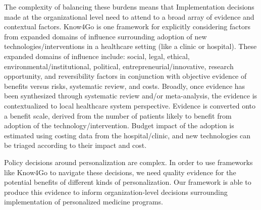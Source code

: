 The complexity of balancing these burdens means that Implementation decisions made at the organizational level need to attend to a broad array of evidence and contextual factors. Know4Go \cite{martin2016hospital} is one framework for explicitly considering factors from expanded domains of influence surrounding adoption of new technologies/interventions in a healthcare setting (like a clinic or hospital). These expanded domains of influence include: social, legal, ethical, environmental/institutional, political, entrepreneurial/innovative, research opportunity, and reversibility factors in conjunction with objective evidence of benefits versus risks, systematic review, and costs.  Broadly, once evidence has been synthesized through systematic review and/or meta-analysis, the evidence is contextualized to local healthcare system perspective.  Evidence is converted onto a benefit scale, derived from the number of patients likely to benefit from adoption of the technology/intervention.  Budget impact of the adoption is estimated using costing data from the hospital/clinic, and new technologies can be triaged according to their impact and cost.  

Policy decisions around personalization are complex. In order to use frameworks like Know4Go to navigate these decisions, we need quality evidence for the potential benefits of different kinds of personalization. Our framework is able to produce this evidence to inform organization-level decisions surrounding implementation of personalized medicine programs.


